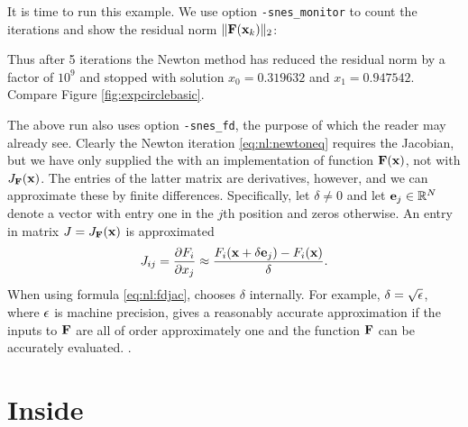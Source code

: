 It is time to run this example.  We use option \texttt{-snes\_monitor} to count the iterations and show the residual norm $\|\mathbf{F}(\mathbf{x}_k)\|_2$:
Thus after 5 iterations the Newton method has reduced the residual norm by a factor of $10^9$ and stopped with solution $x_0=0.319632$ and $x_1=0.947542$.  Compare Figure \ref{fig:expcirclebasic}.

The above run also uses option \texttt{-snes\_fd}, the purpose of which the reader may already see.  Clearly the Newton iteration \eqref{eq:nl:newtoneq} requires the Jacobian, but we have only supplied the \pSNES with an implementation of function $\mathbf{F}(\mathbf{x})$, not with $J_{\mathbf{F}}(\mathbf{x})$.  The entries of the latter matrix are derivatives, however, and we can approximate these by finite differences.  Specifically, let $\delta{}$ and let $\mathbf{e}_j\in \mathbb{R}^N$ denote a vector with entry one in the $j$th position and zeros otherwise.  An entry in matrix $J=J_{\mathbf{F}}(\mathbf{x})$ is approximated
\begin{equation}
J_{ij} = \frac{\partial F_i}{\partial x_j} \approx \frac{F_i(\mathbf{x}+\delta \mathbf{e}_j) - F_i(\mathbf{x})}{\delta}.  \label{eq:nl:fdjac}
\end{equation}
When using formula \eqref{eq:nl:fdjac}, \PETSc chooses $\delta$ internally.  For example, $\delta = \sqrt{\epsilon}$, where $\epsilon$ is machine precision, gives a reasonably accurate approximation if the inputs to $\mathbf{F}$ are all of order approximately one and the function $\mathbf{F}$ can be accurately evaluated. \citep{Kelley2003}.


\section{Inside \pSNES} \label{sec:insidesnes}

